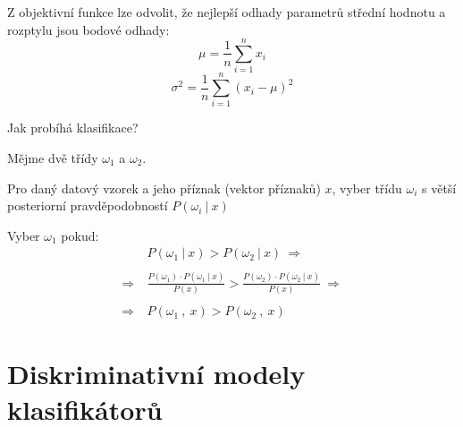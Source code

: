 \begin{compactitem}
    \item Z objektivní funkce lze odvolit, že nejlepší odhady parametrů střední hodnotu a rozptylu jsou bodové odhady:
    $$ {\displaystyle \mu = \frac{1}{n} \sum_{i=1}^n x_i } $$
    $$ {\displaystyle \sigma^2 = \frac{1}{n} \sum_{i=1}^n (x_i - \mu)^2 } $$

    \item Jak probíhá klasifikace? \begin{compactitem}
        \item Mějme dvě třídy $\omega_1$ a $\omega_2$.

        \item Pro daný datový vzorek a jeho příznak (vektor příznaků) $x$, vyber třídu $\omega_i$ s větší posteriorní pravděpodobností $P(\omega_i ~|~ x)$

        \item Vyber $\omega_1$ pokud:
        \begin{equation}
            \begin{split}
                &P(\omega_1 ~|~ x) > P (\omega_2 ~|~ x) ~\Rightarrow~ \\
                \\
                ~\Rightarrow~ &\frac{P(\omega_1) \cdot P(\omega_1 ~|~ x)}{P(x)} > \frac{P(\omega_2) \cdot P(\omega_2 ~|~ x)}{P(x)} ~\Rightarrow~ \\
                \\
                ~\Rightarrow~ &P(\omega_1 ~,~ x) > P(\omega_2 ~,~ x)
            \end{split}
        \end{equation}

    \end{compactitem}

\end{compactitem}


\section{Diskriminativní modely klasifikátorů}

